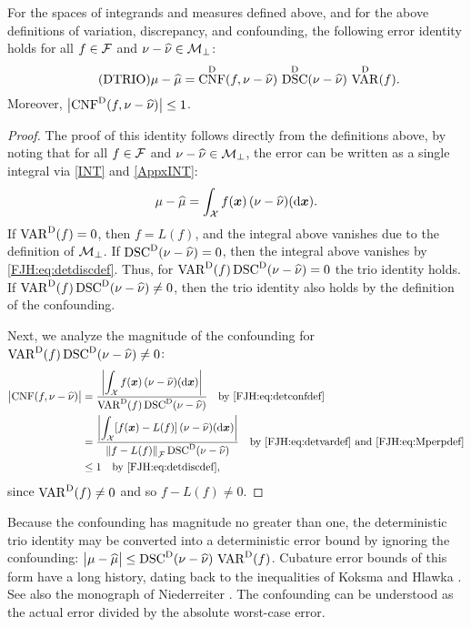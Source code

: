 \documentclass[graybox,footinfo]{svmult}
\DeclareMathOperator{\algn}{CNF}
\DeclareMathOperator{\disc}{DSC}
\DeclareMathOperator{\Var}{VAR}
\begin{document}
\begin{theorem}  \label{FJH:thm:dtrio} For the spaces 
of integrands and 
measures defined above, and for the above definitions of variation, discrepancy, and 
confounding, the following error identity holds for all $f \in \mathcal{F}$ and $\nu - \widehat{\nu}  \in 
\mathcal{M}_\bot$: 
\begin{equation} \tag{DTRIO} \label{FJH:eq:dtrio}
\mu - \hmu  = \algn^\Dt(f,\nu - \hnu) \, \disc^\Dt(\nu - \hnu) \, \Var^{\Dt}(f).
\end{equation}
Moreover, $\abs{\algn^\Dt(f,\nu - \hnu)} \le 1$. 
\end{theorem}
\begin{proof}  The proof of this identity follows directly from the definitions above, by 
noting that for all $f \in \mathcal{F}$ and $\nu - \widehat{\nu}  \in \mathcal{M}_\bot$, the error can be written as a 
single integral via \eqref{INT} and \eqref{AppxINT}:
	\begin{equation} \label{FJH:eq:err_as_int}
	\mu - \hmu   =  \int_{\cx} f(\bsx) \, (\nu - \hnu)(\D \bsx).
	\end{equation}
	If $\Var^{\Dt}(f) = 0$, then $f = L(f)$, and the integral above vanishes due to the 
	definition of $\mathcal{M}_{\bot}$.  If $\disc^\Dt(\nu - \hnu) = 0$, then the integral above 
	vanishes by \eqref{FJH:eq:detdiscdef}.  Thus, for $\Var^{\Dt}(f) \disc^\Dt(\nu - \hnu) = 
	0$ 
	the trio identity holds. If $\Var^{\Dt}(f) \disc^\Dt(\nu - \hnu) \ne 0$, then the trio 
	identity also holds by the definition of the confounding.
	
	Next, we analyze the magnitude of the confounding for $\Var^{\Dt}(f) \disc^\Dt(\nu - 
	\hnu) \ne 0$: 
	\begin{align*}
	\abs{\algn(f,\nu - \hnu)} & = 
		\frac{\biggl \lvert\displaystyle\int_{\cx} f(\bsx) \, (\nu - \hnu)(\D 
			\bsx) \biggr \rvert}{\Var^\Dt(f)\disc^\Dt(\nu - \hnu)} \quad \text{by 
			\eqref{FJH:eq:detconfdef}}\\
		& = \frac{\biggl \lvert\displaystyle\int_{\cx} [f(\bsx) - L(f)] \, (\nu - \hnu)(\D 
			\bsx) \biggr \rvert}{\norm{f-L(f)}_{\cf}\disc^\Dt(\nu - \hnu)} \quad \text{by 
			\eqref{FJH:eq:detvardef} and \eqref{FJH:eq:Mperpdef}} \\
		& \le 1 \quad \text{by \eqref{FJH:eq:detdiscdef}},
\end{align*}
since $\Var^{\Dt}(f) \ne 0$ and so $f - L(f) \ne 0$.
\end{proof}

Because the confounding has magnitude no greater than one, the deterministic trio 
identity may be converted into a deterministic error bound by 
ignoring the confounding:  $\abs{\mu - \hmu}  \le \disc^\Dt(\nu - \hnu) \, \Var^{\Dt}(f)$.  
Cubature error bounds of this form have a long history, dating back to the inequalities of 
Koksma \cite{Kok42} and Hlawka \cite{Hla61}. See also the monograph of Niederreiter 
\cite{Nie92}.  The confounding can be understood as the actual error divided by the 
absolute worst-case error.
\end{document}

